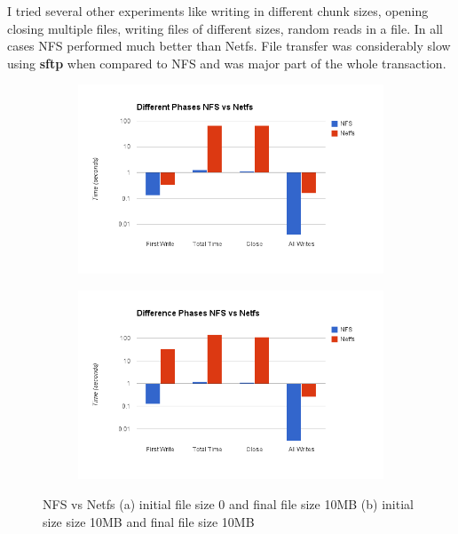 \documentclass[10pt] {article}
\begin{document}
I tried several other experiments like writing in different chunk sizes, opening closing multiple files, writing files of different sizes, random reads in a file. In all cases NFS performed much better than Netfs. File transfer was considerably slow using \textbf{sftp} when compared to NFS and was major part of the whole transaction.

\begin{figure}[ht!]
\centering
\begin{subfigure}{.5\textwidth}
\centering
\includegraphics[width=\linewidth]{netfs1.png}
\caption{}
\label{fig:thvsfair1}
\end{subfigure}%
\begin{subfigure}{.5\textwidth}
\centering
\includegraphics[width=\linewidth]{netfs2.png}
\caption{}
\label{fig:thvsfair2}
\end{subfigure}
\caption{NFS vs Netfs (a) initial file size 0 and final file size 10MB (b) initial size size 10MB and final file size 10MB}
\label{fig:thvsfair}
\end{figure}
\end{document}
